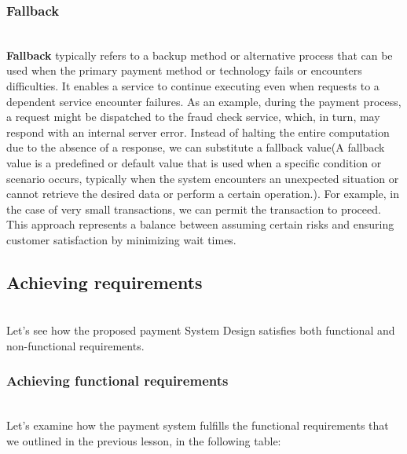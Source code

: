 \subsubsection{Fallback}\label{n8VZsViJtCNnubo3LUcyg}
\\
\textbf{Fallback} typically refers to a backup method or alternative process that can be used when the primary payment method or technology fails or encounters difficulties. It enables a service to continue executing even when requests to a dependent service encounter failures. As an example, during the payment process, a request might be dispatched to the fraud check service, which, in turn, may respond with an internal server error. Instead of halting the entire computation due to the absence of a response, we can substitute a fallback value(A fallback value is a predefined or default value that is used when a specific condition or scenario occurs, typically when the system encounters an unexpected situation or cannot retrieve the desired data or perform a certain operation.). For example, in the case of very small transactions, we can permit the transaction to proceed. This approach represents a balance between assuming certain risks and ensuring customer satisfaction by minimizing wait times.

\subsection{Achieving requirements}\label{8OeDcDiOn3s5jOHLsV3xh}
\\
Let's see how the proposed payment System Design satisfies both functional and non-functional requirements.

\subsubsection{Achieving functional requirements}\label{R-6i9aQCZotGVu4B7hG0f}
\\
Let's examine how the payment system fulfills the functional requirements that we outlined in the previous lesson, in the following table:

